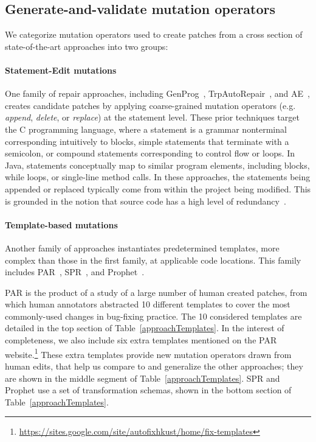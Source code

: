 \documentclass[conference]{IEEEtran}
\begin{document}
\subsection{Generate-and-validate mutation operators} 
\label{categorization}

We categorize mutation operators used to create patches from a cross
section of state-of-the-art approaches into two groups: 

\paragraph{Statement-Edit mutations}
One family of repair approaches, including GenProg~\cite{legoues12}, 
TrpAutoRepair~\cite{Qi13TrpAutoR}, and AE~\cite{Weimer13},
creates candidate 
patches by applying coarse-grained mutation operators (e.g. \emph{append}, \emph{delete}, or 
\emph{replace}) at the statement level. These prior techniques target the C programming language, where
a statement is a grammar nonterminal corresponding intuitively to blocks,
simple statements that terminate
with a semicolon, or compound statements corresponding to control flow or
loops. In Java, statements conceptually map to similar program elements, including blocks,  while loops, or single-line
method calls. In these approaches, the statements being appended or replaced
typically come from within the project being modified. This is grounded in the
notion that source code has a high level of
redundancy~\cite{Hindle12Naturalness}. 

\paragraph{Template-based mutations}
Another family of approaches instantiates
predetermined templates, more complex than those in the first family, at applicable code locations.  This family includes PAR~\cite{kim2013}, 
SPR~\cite{long15SPR}, and 
Prophet~\cite{long16proph}.

PAR is the product of a study of a large number of 
human 
created patches, from which human annotators abstracted 10 different templates to cover
the most commonly-used changes in bug-fixing practice.
The 10 considered templates are detailed in the top section of Table~\ref{approachTemplates}. In the interest of completeness, we also include six extra templates 
mentioned on the PAR website.\footnote{\url{https://sites.google.com/site/autofixhkust/home/fix-templates}} 
These extra templates provide new mutation operators drawn from human edits,
that help us compare to and
generalize the other approaches; they are shown in the middle segment of
Table~\ref{approachTemplates}. 
SPR and Prophet use a set of transformation schemas,
shown in the bottom section of Table~\ref{approachTemplates}.
\end{document}
